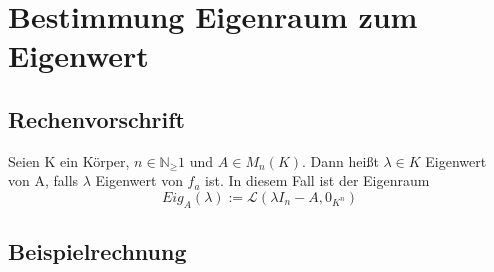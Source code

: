 \section{Bestimmung Eigenraum zum Eigenwert}

\subsection{Rechenvorschrift}
Seien K ein Körper, $n\in \mathbb{N}_\geq1$ und $A \in M_n(K)$. Dann heißt $\lambda \in K$
Eigenwert von A, falls $\lambda$ Eigenwert von $f_a$ ist. In diesem Fall ist der Eigenraum
\[Eig_A(\lambda):=\mathcal{L}(\lambda I_n - A, 0_{K^n})\]

\subsection{Beispielrechnung}

